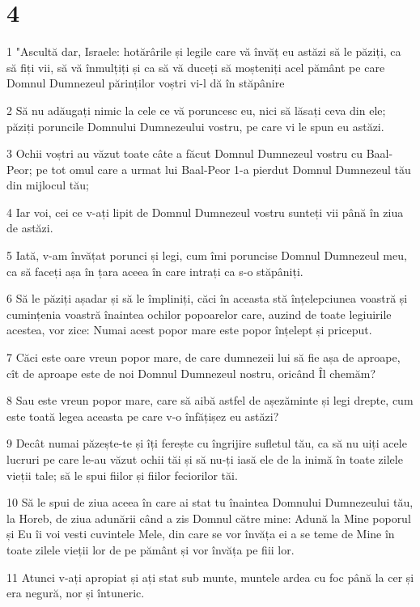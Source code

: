 \chapter{4}

\par 1 "Ascultă dar, Israele: hotărârile și legile care vă învăț eu astăzi să le păziți, ca să fiți vii, să vă înmulțiți și ca să vă duceți să moșteniți acel pământ pe care Domnul Dumnezeul părinților voștri vi-l dă în stăpânire
\par 2 Să nu adăugați nimic la cele ce vă poruncesc eu, nici să lăsați ceva din ele; păziți poruncile Domnului Dumnezeului vostru, pe care vi le spun eu astăzi.
\par 3 Ochii voștri au văzut toate câte a făcut Domnul Dumnezeul vostru cu Baal-Peor; pe tot omul care a urmat lui Baal-Peor 1-a pierdut Domnul Dumnezeul tău din mijlocul tău;
\par 4 Iar voi, cei ce v-ați lipit de Domnul Dumnezeul vostru sunteți vii până în ziua de astăzi.
\par 5 Iată, v-am învățat porunci și legi, cum îmi poruncise Domnul Dumnezeul meu, ca să faceți așa în țara aceea în care intrați ca s-o stăpâniți.
\par 6 Să le păziți așadar și să le împliniți, căci în aceasta stă înțelepciunea voastră și cumințenia voastră înaintea ochilor popoarelor care, auzind de toate legiuirile acestea, vor zice: Numai acest popor mare este popor înțelept și priceput.
\par 7 Căci este oare vreun popor mare, de care dumnezeii lui să fie așa de aproape, cît de aproape este de noi Domnul Dumnezeul nostru, oricând Îl chemăm?
\par 8 Sau este vreun popor mare, care să aibă astfel de așezăminte și legi drepte, cum este toată legea aceasta pe care v-o înfățișez eu astăzi?
\par 9 Decât numai păzește-te și îți ferește cu îngrijire sufletul tău, ca să nu uiți acele lucruri pe care le-au văzut ochii tăi și să nu-ți iasă ele de la inimă în toate zilele vieții tale; să le spui fiilor și fiilor feciorilor tăi.
\par 10 Să le spui de ziua aceea în care ai stat tu înaintea Domnului Dumnezeului tău, la Horeb, de ziua adunării când a zis Domnul către mine: Adună la Mine poporul și Eu îi voi vesti cuvintele Mele, din care se vor învăța ei a se teme de Mine în toate zilele vieții lor de pe pământ și vor învăța pe fiii lor.
\par 11 Atunci v-ați apropiat și ați stat sub munte, muntele ardea cu foc până la cer și era negură, nor și întuneric.

